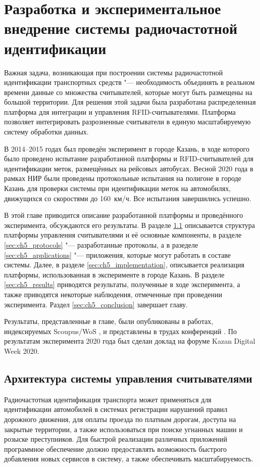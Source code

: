 \chapter{Разработка и экспериментальное внедрение системы радиочастотной идентификации}\label{ch:ch5}
Важная задача, возникающая при построении системы радиочастотной идентификации транспортных средств "--- необходимость объединять в реальном времени данные со множества считывателей, которые могут быть размещены на большой территории. Для решения этой задачи была разработана распределенная платформа для интеграции и управления RFID-считывателями. Платформа позволяет интегрировать разрозненные считыватели в единую масштабируемую систему обработки данных.

В 2014--2015 годах был проведён эксперимент в городе Казань, в ходе которого было проведено испытание разработанной платформы и RFID-считывателей для идентификации меток, размещённых на рейсовых автобусах. Весной 2020 года в рамках НИР были проведены протокольные испытания на полигоне в городе Казань для проверки системы при идентификации меток на автомобилях, движущихся со скоростями до 160~км/ч. Все испытания завершились успешно.

В этой главе приводится описание разработанной платформы и проведённого эксперимента, обсуждаются его результаты. В разделе \ref{sec:ch5_architecture} описывается структура платформы управления считывателями и её основные компоненты, в разделе \ref{sec:ch5_protocols} "--- разработанные протоколы, а в разеделе \ref{sec:ch5_applications} "--- приложения, которые могут работать в составе системы. Далее, в разделе \ref{sec:ch5_implementation}, описывается реализация платформы, использованная в эксперименте в городе Казань. В разделе \ref{sec:ch5_results} приводятся результаты, полученные в ходе эксперимента, а также приводятся некоторые наблюдения, отмеченные при проведении эксперимента. Раздел \ref{sec:ch5_conclusion} завершает главу.

Результаты, представленные в главе, были опубликованы в работах, индексируемых Scoupus/WoS \cite{RFIDCTRL_NETS2CARS2014, RFIDTA2012}, и представлены в трудах конференций \cite{RFIDCTRL_DCCN2017, RFIDCTRL_VSPU2014}. По результатам эксперимента 2020 года был сделан доклад на форуме Kazan Digital Week 2020.


\section{Архитектура системы управления считывателями}\label{sec:ch5_architecture}
Радиочастотная идентификация транспорта может применяться для идентификации автомобилей в системах регистрации нарушений правил дорожного движения, для оплаты проезда по платным дорогам, доступа на закрытые территории, а также использоваться при поиске угнанных машин и розыске преступников. Для быстрой реализации различных приложений программное обеспечение должно предоставлять возможность быстрого добавления новых сервисов в систему, а также обеспечивать масштабируемость.

